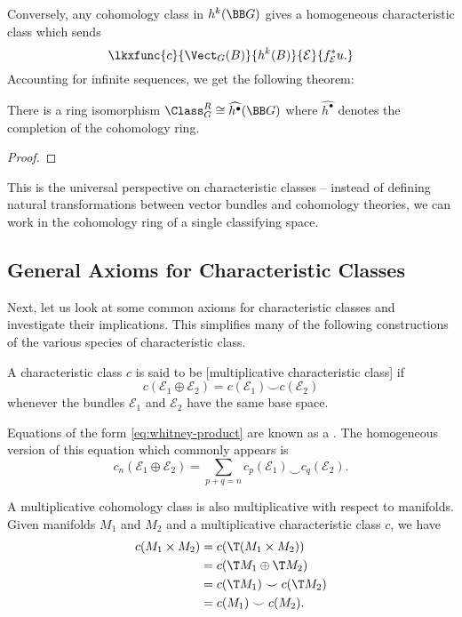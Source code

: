 Conversely, any cohomology class in $h^k(\BB G)$ gives a homogeneous characteristic class which sends
\[
	\lkxfunc{c}{\Vect_G(B)}{h^k(B)}{\mathcal{E}}{f_{\mathcal{E}}^*u.}
\]
Accounting for infinite sequences, we get the following theorem:

\begin{theorem}\label{thm:universal-characteristic-classes}
	There is a ring isomorphism $\Class^R_G\cong \widehat{h^\bullet}(\BB G)$
	where $\widehat{h^\bullet}$ denotes the completion of the cohomology ring.
\end{theorem}
\begin{proof}
\end{proof}

This is the universal perspective on characteristic classes -- instead of defining natural transformations between vector bundles and cohomology theories, we can work in the cohomology ring of a single classifying space.

\subsection{General Axioms for Characteristic Classes}

Next, let us look at some common axioms for characteristic classes and investigate their implications. This simplifies many of the following constructions of the various species of characteristic class.

\begin{definition}
	A characteristic class $c$ is said to be [multiplicative characteristic class] if \begin{equation}\label{eq:whitney-product}
		c(\mathcal{E}_1\oplus \mathcal{E}_2)=c(\mathcal{E}_1)\smile c(\mathcal{E}_2)
	\end{equation}
	whenever the bundles $\mathcal{E}_1$ and $\mathcal{E}_2$ have the same base space.
\end{definition}

Equations of the form \cref{eq:whitney-product} are known as a . The homogeneous version of this equation which commonly appears is
\[
	c_n(\mathcal{E}_1\oplus \mathcal{E}_2) = \sum_{p+q=n}c_p(\mathcal{E}_1)\smile c_q(\mathcal{E}_2).
\]

\begin{remark}
	A multiplicative cohomology class is also multiplicative with respect to manifolds. Given manifolds $M_1$ and $M_2$ and a multiplicative characteristic class $c$, we have
	\[
		\begin{aligned}
			c(M_1\times M_2) & = c(\T(M_1\times M_2))      \\
			                 & = c(\T M_1\oplus \T M_2)    \\
			                 & = c(\T M_1)\smile c(\T M_2) \\
			                 & = c(M_1)\smile c(M_2).
		\end{aligned}
	\]
\end{remark}

